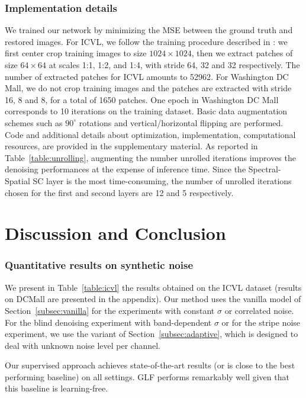 \subsubsection{Implementation details}

We trained our network by minimizing the MSE between the ground truth and restored images.
For ICVL, we follow the training procedure described in \cite{wei_3-d_2020}: we first center crop training images to size $1024 \times 1024$, 
then we extract patches of size $64 \times 64$ at scales 1:1, 1:2, and 1:4, with stride 64, 32 and 32 respectively.
The number of extracted patches for ICVL amounts to 52962.
For Washington DC Mall, we do not crop training images and the patches are extracted with stride 16, 8 and 8, for a total of 1650 patches.
One epoch in Washington DC Mall corresponds to 10 iterations on the training dataset.
Basic data augmentation schemes such as $90^\circ$ rotations and vertical/horizontal flipping are performed.
Code and additional details about optimization, implementation, computational resources, are provided in the supplementary material.
As reported in Table~\ref{table:unrolling}, augmenting the number unrolled iterations improves the denoising performances at the expense of inference time.
Since the Spectral-Spatial SC layer is the most time-consuming, the number of unrolled iterations chosen for the first and second layers are 12 and 5 respectively.


\section{Discussion and Conclusion}

\subsubsection{Quantitative results on synthetic noise}

We present in Table~\ref{table:icvl} the results obtained on the ICVL dataset (results on DCMall are presented in the appendix). 
Our method uses the vanilla model of Section~\ref{subsec:vanilla} for the experiments with constant $\sigma$ or correlated noise. 
For the blind denoising experiment with band-dependent $\sigma$ or for the stripe noise experiment, we use the variant of Section~\ref{subsec:adaptive}, which is designed to deal with unknown noise level per channel.

Our supervised approach achieves state-of-the-art results (or is close to the best performing baseline) on all settings. GLF performs remarkably well given that this baseline is learning-free.

